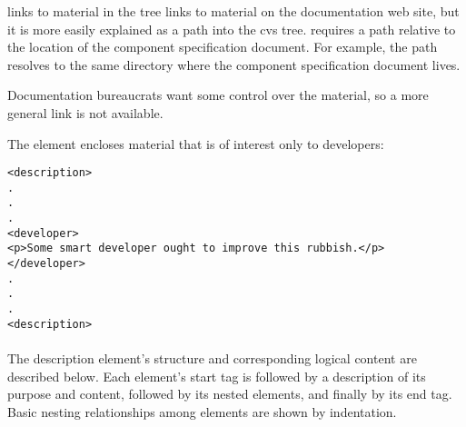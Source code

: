 \documentclass[11pt]{article}
\begin{document}
 links to material in the  tree
 links to material on the documentation web site,
but it is more easily explained as a path into the cvs tree.   requires
a path relative to the location of the component specification document.  For
example, the path  resolves to the same directory
where the component specification document lives.

Documentation bureaucrats want some control over the material, so a more general link is not available.

The  element encloses material that is of interest only to
developers:

\begin{verbatim}
<description>
.
.
.
<developer>
<p>Some smart developer ought to improve this rubbish.</p>
</developer>
.
.
.
<description>
\end{verbatim}

\paragraph{\SUBSUBSECreference}
\label{\SUBSUBSECreference}

The description element's \xml{} structure and corresponding logical
content are described below.  Each element's start tag is followed by a
description of its purpose and content, followed by its nested elements,
and finally by its end tag.  Basic nesting relationships among elements are
shown by indentation.
\end{document}
